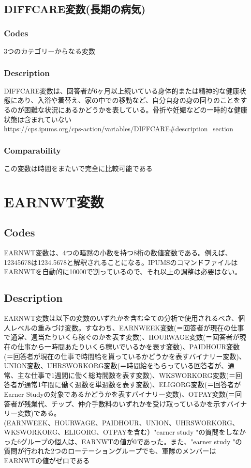 \documentclass{jsarticle}
\begin{document}
\subsection{DIFFCARE変数(長期の病気)}

\subsubsection{Codes}
3つのカテゴリーからなる変数

\subsubsection{Description}
DIFFCARE変数は、回答者が6ヶ月以上続いている身体的または精神的な健康状態にあり、入浴や着替え、家の中での移動など、自分自身の身の回りのことをするのが困難な状況にあるかどうかを表している。骨折や妊娠などの一時的な健康状態は含まれていない\\
\url{https://cps.ipums.org/cps-action/variables/DIFFCARE#description_section}

\subsubsection{Comparability}
この変数は時間をまたいで完全に比較可能である


\section{EARNWT変数}

\subsection{Codes}
EARNWT変数は、4つの暗黙の小数を持つ8桁の数値変数である。例えば、12345678は1234.5678と解釈されることになる。IPUMSのコマンドファイルはEARNWTを自動的に10000で割っているので、それ以上の調整は必要はない。

\subsection{Description}
EARNWT変数は以下の変数のいずれかを含む全ての分析で使用されるべき、個人レベルの重みづけ変数。すなわち、EARNWEEK変数(＝回答者が現在の仕事で通常、週当たりいくら稼ぐのかを表す変数)、HOURWAGE変数(＝回答者が現在の仕事から一時間あたりいくら稼いでいるかを表す変数)、PAIDHOUR変数(＝回答者が現在の仕事で時間給を貰っているかどうかを表すバイナリー変数)、UNION変数、UHRSWORKORG変数(＝時間給をもらっている回答者が、通常、主な仕事で1週間に働く総時間数を表す変数)、WKSWORKORG変数(＝回答者が通常1年間に働く週数を単週数を表す変数)、ELIGORG変数(＝回答者がEarner Studyの対象であるかどうかを表すバイナリー変数)、OTPAY変数(＝回答者が残業代、チップ、仲介手数料のいずれかを受け取っているかを示すバイナリー変数)である。\\
  
(EARNWEEK、HOURWAGE、PAIDHOUR、UNION、UHRSWORKORG、WKSWORKORG、ELIGORG、OTPAYを含む）"earner study "の質問をしなかった6グループの個人は、EARNWTの値が0であった。また、"earner study "の質問が行われた2つのローテーショングループでも、軍隊のメンバーはEARNWTの値がゼロである
\end{document}
